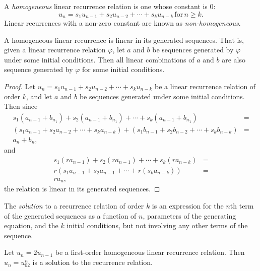 \begin{defn}
    A \emph{homogeneous} linear recurrence relation is one whose constant is $0$: \[u_n = s_1u_{n-1} + s_2u_{n-2} + \cdots + s_ku_{n-k} \,\textrm{for}\, n \geq k.\] Linear recurrences with a non-zero constant are known as \emph{non-homogeneous}.
\end{defn}

\begin{prop}\label{linear-combinations-are-recurrence-solutions}
    A homogeneous linear recurrence is linear in its generated sequences. That is, given a linear recurrence relation $\varphi$, let $a$ and $b$ be sequences generated by $\varphi$ under some initial conditions. Then all linear combinations of $a$ and $b$ are also sequence generated by $\varphi$ for some initial conditions.
\end{prop}

\begin{proof}
    Let $u_n = s_1u_{n-1} + s_2u_{n-2} + \cdots + s_ku_{n-k}$ be a linear recurrence relation of order $k$, and let $a$ and $b$ be sequences generated under some initial conditions. Then since
    \begin{align*}
        s_1(a_{n-1} + b_{n_1}) + s_2(a_{n-1} + b_{n_1}) + \cdots + s_k(a_{n-1} + b_{n_1}) & = \\ (s_1a_{n-1} + s_2a_{n-2} + \cdots + s_ka_{n-k}) + (s_1b_{n-1} + s_2b_{n-2} + \cdots + s_kb_{n-k}) & = \\
        a_n + b_n, &
    \end{align*}
    and
    \begin{align*}
        s_1(ra_{n-1}) + s_2(ra_{n-1}) + \cdots + s_k(ra_{n-k}) & = \\
        r(s_1a_{n-1} + s_2a_{n-1} + \cdots + r(s_ka_{n-k})) & = \\
        ra_n, &
    \end{align*}
    the relation is linear in its generated sequences.
\end{proof}

\begin{defn}
    The \emph{solution} to a recurrence relation of order $k$ is an expression for the $n$th term of the generated sequences as a function of $n$, parameters of the generating equation, and the $k$ initial conditions, but not involving any other terms of the sequence.
\end{defn}

\begin{exmp}
    Let $u_n = 2u_{n-1}$ be a first-order homogeneous linear recurrence relation. Then $u_n = u_02^n$ is a solution to the recurrence relation.
\end{exmp}

